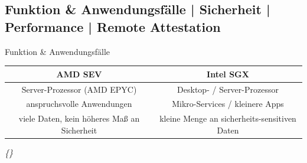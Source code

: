 \documentclass{sdqbeamer}
\begin{document}
\subsection{Funktion \& Anwendungsfälle | Sicherheit | Performance | Remote Attestation}

\begin{frame}{Funktion \& Anwendungsfälle}
	\begin{center}
		\begin{tabular}[h]{c|c}
			\color{kitgreen} AMD SEV & \color{kitgreen}Intel SGX \\
			\hline
			Server-Prozessor (AMD EPYC) & Desktop- / Server-Prozessor \\
			anspruchsvolle Anwendungen & Mikro-Services / kleinere Apps \\
			viele Daten, kein höheres Maß an Sicherheit & kleine Menge an sicherheits-sensitiven Daten \\
			
		\end{tabular}
	\end{center}


	\vfill
	\small\textit{\{\cite{mofrad}\}}
\end{frame}
\end{document}
